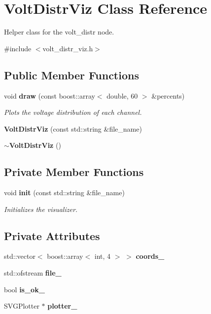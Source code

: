 \section{\-Volt\-Distr\-Viz \-Class \-Reference}
\label{classVoltDistrViz}


\-Helper class for the volt\-\_\-distr node.  




{\ttfamily \#include $<$volt\-\_\-distr\-\_\-viz.\-h$>$}

\subsection*{\-Public \-Member \-Functions}
\begin{DoxyCompactItemize}
\item 
void {\bf draw} (const boost\-::array$<$ double, 60 $>$ \&percents)
\begin{DoxyCompactList}\small\item\em \-Plots the voltage distribution of each channel. \end{DoxyCompactList}\item 
{\bf \-Volt\-Distr\-Viz} (const std\-::string \&file\-\_\-name)
\item 
{\bf $\sim$\-Volt\-Distr\-Viz} ()
\end{DoxyCompactItemize}
\subsection*{\-Private \-Member \-Functions}
\begin{DoxyCompactItemize}
\item 
void {\bf init} (const std\-::string \&file\-\_\-name)
\begin{DoxyCompactList}\small\item\em \-Initializes the visualizer. \end{DoxyCompactList}\end{DoxyCompactItemize}
\subsection*{\-Private \-Attributes}
\begin{DoxyCompactItemize}
\item 
std\-::vector$<$ boost\-::array$<$ int, 4 $>$ $>$ {\bf coords\-\_\-}
\item 
std\-::ofstream {\bf file\-\_\-}
\item 
bool {\bf is\-\_\-ok\-\_\-}
\item 
\-S\-V\-G\-Plotter $\ast$ {\bf plotter\-\_\-}
\end{DoxyCompactItemize}


